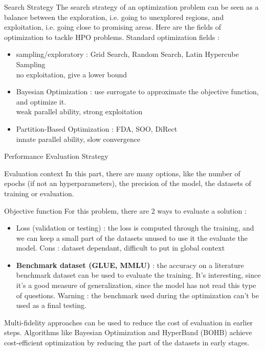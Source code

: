 \begin{frame}{Search Strategy}
    The search strategy of an optimization problem can be seen as a balance between the exploration, i.e. going to unexplored regions, and exploitation, i.e. going close to promising areas. Here are the fields of optimization to tackle HPO problems. Standard optimization fields : 
    \begin{itemize}
        \item sampling/exploratory : Grid Search, Random Search, Latin Hypercube Sampling \\ \quad no exploitation, give a lower bound
        \item Bayesian Optimization : use surrogate to approximate the objective function, and optimize it. \\ \quad weak parallel ability, strong exploitation
        \item Partition-Based Optimization : FDA, SOO, DiRect \\ \quad innate parallel ability, slow convergence
    \end{itemize}

\end{frame}

\begin{frame}{Performance Evaluation Strategy}
    \begin{block}{Evaluation context}
    In this part, there are many options, like the number of epochs (if not an hyperparameters), the precision of the model, the datasets of training or evaluation. 
        
    \end{block}
    \begin{block}{Objective function}
        For this problem, there are 2 ways to evaluate a solution : 
        \begin{itemize}
            \item Loss (validation or testing) : the loss is computed through the training, and we can keep a small part of the datasets unused to use it the evaluate the model. Cons : dataset dependant, difficult to put in global context
            \item \textbf{Benchmark dataset (GLUE\cite{wang2018glue}, MMLU\cite{hendrycks2021mmlu})} : the accuracy on a literature benchmark dataset can be used to evaluate the training. It's interesting, since it's a good measure of generalization, since the model has not read this type of questions. Warning : the benchmark used during the optimization can't be used as a final testing. 
        \end{itemize}

        Multi-fidelity approaches can be used to reduce the cost of evaluation in earlier steps. Algorithms like Bayesian Optimization and HyperBand (BOHB\cite{DBLP:journals/corr/abs-1807-01774}) achieve cost-efficient optimization by reducing the part of the datasets in early stages.
    \end{block}
    
\end{frame}